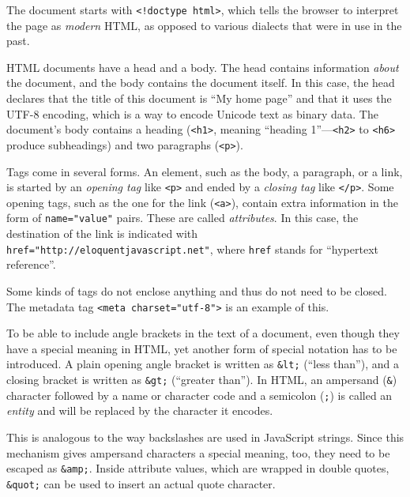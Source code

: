The document starts with \lstinline`<!doctype html>`, which tells the browser to interpret the page as \emph{modern} HTML, as opposed to various dialects that were in use in the past.

HTML documents have a head and a body. The head contains information \emph{about} the document, and the body contains the document itself. In this case, the head declares that the title of this document is ``My home page'' and that it uses the UTF-8 encoding, which is a way to encode Unicode text as binary data. The document's body contains a heading (\lstinline`<h1>`, meaning ``heading 1''—\lstinline`<h2>` to \lstinline`<h6>` produce subheadings) and two paragraphs (\lstinline`<p>`).

Tags come in several forms. An element, such as the body, a paragraph, or a link, is started by an \emph{opening tag} like \lstinline`<p>` and ended by a \emph{closing tag} like \lstinline`</p>`. Some opening tags, such as the one for the link (\lstinline`<a>`), contain extra information in the form of \lstinline`name="value"` pairs. These are called \emph{attributes}. In this case, the destination of the link is indicated with \lstinline`href="http://eloquentjavascript.net"`, where \lstinline`href` stands for ``hypertext reference''.

Some kinds of tags do not enclose anything and thus do not need to be closed. The metadata tag \lstinline`<meta charset="utf-8">` is an example of this.

To be able to include angle brackets in the text of a document, even though they have a special meaning in HTML, yet another form of special notation has to be introduced. A plain opening angle bracket is written as \lstinline`&lt;` (``less than''), and a closing bracket is written as \lstinline`&gt;` (``greater than''). In HTML, an ampersand (\lstinline`&`) character followed by a name or character code and a semicolon (\lstinline`;`) is called an \emph{entity} and will be replaced by the character it encodes.

This is analogous to the way backslashes are used in JavaScript strings. Since this mechanism gives ampersand characters a special meaning, too, they need to be escaped as \lstinline`&amp;`. Inside attribute values, which are wrapped in double quotes, \lstinline`&quot;` can be used to insert an actual quote character.

